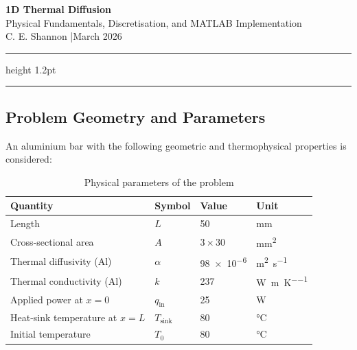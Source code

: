 \documentclass[11pt, a4paper]{scrartcl}
\begin{document}
\begin{center}
  {\LARGE\bfseries\color{myblue} 1D Thermal Diffusion}\\[6pt]
  {\large Physical Fundamentals, Discretisation, and MATLAB Implementation}\\[8pt]
  {\normalsize C. E. Shannon \quad|\quad March 2026}
\end{center}

\vspace{0.5em}
\hrule height 1.2pt
\vspace{1.5em}

\tableofcontents

\vspace{1.5em}
\hrule
\newpage
\begin{onehalfspace}
\section{Problem Geometry and Parameters}

An aluminium bar with the following geometric and thermophysical properties is considered:

\begin{table}[h!]
\centering
\caption{Physical parameters of the problem}
\begin{tabular}{llll}
\toprule
\textbf{Quantity} & \textbf{Symbol} & \textbf{Value} & \textbf{Unit} \\
\midrule
Length                        & $L$             & \num{50}            & \si{\milli\meter} \\
Cross-sectional area          & $A$             & $\num{3} \times \num{30}$ & \si{\milli\meter\squared} \\
Thermal diffusivity (Al)      & $\alpha$        & \num{98e-6}         & \si{\meter\squared\per\second} \\
Thermal conductivity (Al)     & $k$             & \num{237}           & \si{\watt\per\meter\per\kelvin} \\
Applied power at $x=0$        & $q_\text{in}$   & \num{25}            & \si{\watt} \\
Heat-sink temperature at $x=L$& $T_\text{sink}$ & \num{80}            & \si{\celsius} \\
Initial temperature           & $T_0$           & \num{80}            & \si{\celsius} \\
\bottomrule
\end{tabular}
\end{table}


\end{onehalfspace}
\end{document}
